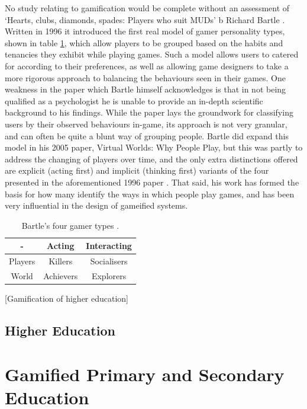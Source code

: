 \documentclass[12pt]{article}
\begin{document}
No study relating to gamification would be complete without an assessment of `Hearts, clubs, diamonds, spades: Players who suit MUDs' b Richard Bartle \cite{bartle1996hearts}. Written in 1996 it introduced the first real model of gamer personality types, shown in table \ref{table:cards}, which allow players to be grouped based on the habits and tenancies they exhibit while playing games. Such a model allows users to catered for according to their preferences, as well as allowing game designers to take a more rigorous approach to balancing the behaviours seen in their games.  One weakness in the paper which Bartle himself acknowledges is that in not being qualified as a psychologist he is unable to provide an in-depth scientific background to his findings. While the paper lays the groundwork for classifying users by their observed behaviours in-game, its approach is not very granular, and can often be quite a blunt way of grouping people. Bartle did expand this model in his 2005 paper, Virtual Worlds: Why People Play, but this was partly to address the changing of players over time, and the only extra distinctions offered are explicit (acting first) and implicit (thinking first) variants of the four presented in the aforementioned 1996 paper \cite{bartle2005play}. That said, his work has formed the basis for how many identify the ways in which people play games, and has been very influential in the design of gameified systems.

\begin{table}[p]
\begin{tabular}{|c|c|c|}
	\hline - & Acting & Interacting \\ 
	\hline Players & Killers & Socialisers \\ 
	\hline World & Achievers & Explorers \\ 
	\hline 
\end{tabular}
\caption{Bartle's four gamer types \cite{bartle1996hearts}.}
\label{table:cards}
\end{table}

[Gamification of higher education]

\subsection{Higher Education}

\section{Gamified Primary and Secondary Education}
\end{document}
